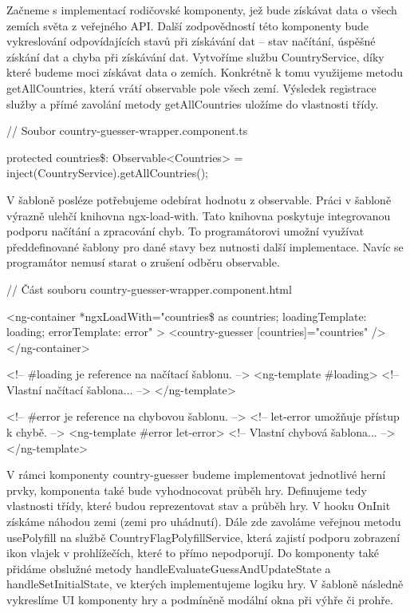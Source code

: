 Začneme s implementací rodičovské komponenty, jež bude získávat data o všech zemích světa z veřejného API. 
Další zodpovědností této komponenty bude vykreslování odpovídajících stavů při získávání dat -- stav načítání, úspěšné získání dat a chyba při získávání dat. 
Vytvoříme službu CountryService, díky které budeme moci získávat data o zemích. Konkrétně k tomu využijeme metodu getAllCountries, která vrátí observable pole všech zemí. 
Výsledek registrace služby a přímé zavolání metody getAllCountries uložíme do vlastnosti třídy.

\begin{prog}
// Soubor country-guesser-wrapper.component.ts

protected countries\$: Observable<Countries> 
  = inject(CountryService).getAllCountries();
\end{prog}

V šabloně posléze potřebujeme odebírat hodnotu z observable. Práci v šabloně výrazně ulehčí knihovna ngx-load-with. 
Tato knihovna poskytuje integrovanou podporu načítání a zpracování chyb. To programátorovi umožní využívat předdefinované šablony pro dané stavy bez nutnosti další implementace. 
Navíc se programátor nemusí starat o zrušení odběru observable.

\begin{prog}
// Část souboru country-guesser-wrapper.component.html

<ng-container
  *ngxLoadWith="countries\$ as countries; 
  loadingTemplate: loading; errorTemplate: error"
>
  <country-guesser [countries]="countries" />
</ng-container>

<!-- \#loading je reference na načítací šablonu. -->
<ng-template \#loading>
  <!-- Vlastní načítací šablona... -->
</ng-template>

<!-- \#error je reference na chybovou šablonu. -->
<!-- let-error umožňuje přístup k chybě. -->
<ng-template \#error let-error>
  <!-- Vlastní chybová šablona... -->
</ng-template>
\end{prog}

V rámci komponenty country-guesser budeme implementovat jednotlivé herní prvky, komponenta také bude vyhodnocovat průběh hry. 
Definujeme tedy vlastnosti třídy, které budou reprezentovat stav a průběh hry. V hooku OnInit získáme náhodou zemi (zemi pro uhádnutí). 
Dále zde zavoláme veřejnou metodu usePolyfill na službě CountryFlagPolyfillService, která zajistí podporu zobrazení ikon vlajek v prohlížečích, které to přímo nepodporují.
Do komponenty také přidáme obslužné metody handleEvaluateGuessAndUpdateState a handleSetInitialState, ve kterých implementujeme logiku hry. 
V šabloně následně vykreslíme UI komponenty hry a podmíněně modální okna při výhře či prohře.

